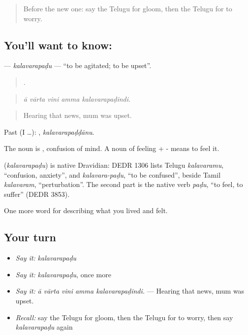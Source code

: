 \label{lesson:TE-C494-kalavarapadu}



\begin{quote}
Before the new one: say the Telugu for gloom, then the Telugu for to worry.
\end{quote}

\subsection*{You'll want to know: }
\textbf{} — \emph{kalavarapaḍu} — \textquotedblleft{}to be agitated; to be upset\textquotedblright{}.

\begin{quote}
    .
\end{quote}

\begin{quote}
\emph{ā vārta vini amma kalavarapaḍindi.}
\end{quote}

\begin{quote}
Hearing that news, mum was upset.
\end{quote}

Past (I …): , \emph{kalavarapaḍḍānu}.

The noun is , confusion of mind. A noun of feeling + - means to feel it.

\begin{cousinweb}
\textbf{} (\emph{kalavarapaḍu}) is native Dravidian: DEDR 1306 lists Telugu \emph{kalavaramu}, \textquotedblleft{}confusion, anxiety\textquotedblright{}, and \emph{kalavara-paḍu}, \textquotedblleft{}to be confused\textquotedblright{}, beside Tamil \emph{kalavaram}, \textquotedblleft{}perturbation\textquotedblright{}. The second part is the native verb \emph{paḍu}, \textquotedblleft{}to feel, to suffer\textquotedblright{} (DEDR 3853).
\end{cousinweb}

\begin{grammarlens}[title={What you've built}]
One more word for describing what you lived and felt.
\end{grammarlens}

\subsection*{Your turn}
\begin{itemize}
\raggedright
  \item \emph{Say it:} \emph{kalavarapaḍu}
  \item \emph{Say it:} \emph{kalavarapaḍu}, once more
  \item \emph{Say it:} \emph{ā vārta vini amma kalavarapaḍindi.} — Hearing that news, mum was upset.
  \item \emph{Recall:} say the Telugu for gloom, then the Telugu for to worry, then say \emph{kalavarapaḍu} again
\end{itemize}

